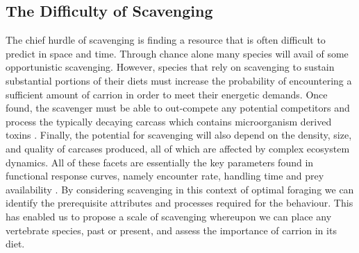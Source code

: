 \documentclass[a4paper,12pt]{article}
\begin{document}

\subsection*{The Difficulty of Scavenging}
The chief hurdle of scavenging is finding a resource that is often difficult to predict in space and time.
Through chance alone many species will avail of some opportunistic scavenging. %
However, species that rely on scavenging to sustain substantial portions of their diets must increase the probability of encountering a sufficient amount of carrion in order to meet their energetic demands.
Once found, the scavenger must be able to out-compete any potential competitors and process the typically decaying carcass which contains microorganism derived toxins  \citep{ruxton2014fruit}.
Finally, the potential for scavenging will also depend on the density, size, and quality of carcases produced, all of which are affected by complex ecosystem dynamics.
All of these facets are essentially the key parameters found in functional response curves, namely encounter rate, handling time and prey availability \citep{jeschke2002predator}. %
By considering scavenging in this context of optimal foraging we can identify the prerequisite attributes and processes required for the behaviour. 
This has enabled us to propose a scale of scavenging whereupon we can place any vertebrate species, past or present, and assess the importance of carrion in its diet. 
\end{document}
